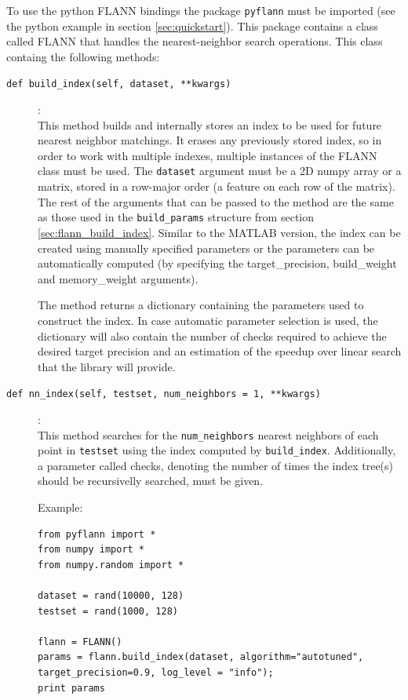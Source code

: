 \documentclass[letter,10pt]{article}
\begin{document}
To use the python FLANN bindings the package \texttt{pyflann} must be imported
(see the python example in section \ref{sec:quickstart}). This package contains
a class called FLANN that handles the nearest-neighbor search operations. This
class containg the following methods:
\begin{description}
\item [\texttt{def build\_index(self, dataset, **kwargs)}] :\\
    This method builds and internally stores an index to be used for future
nearest neighbor matchings. It erases any previously stored index, so in order
to work with multiple indexes, multiple instances of the FLANN class must be
used. The \texttt{dataset} argument must be a 2D numpy array or a matrix, stored in a
row-major order (a feature on each row of the matrix). The
rest of the arguments that can be passed to the method are the same as
 those used in the \texttt{build\_params} structure from
section \ref{sec:flann_build_index}. Similar to the MATLAB version, the index
can be created using manually specified parameters or the parameters can be
automatically computed (by specifying the target\_precision, build\_weight and
memory\_weight arguments).

The method returns a dictionary containing the parameters used to construct the
index. In case automatic parameter selection is used, the dictionary will also
contain the number of checks required to achieve the desired target precision
and an estimation of the speedup over linear search that the library will
provide.


\item [\texttt{def nn\_index(self, testset, num\_neighbors = 1, **kwargs)}] :\\
    This method searches for the \texttt{num\_neighbors} nearest neighbors of
each point in \texttt{testset} using the index computed by
\texttt{build\_index}. Additionally, a parameter called checks, denoting the
number of times the index tree(s) should be recursivelly searched, must be
given.

Example:
\begin{Verbatim}[fontsize=\scriptsize,frame=single]
from pyflann import *
from numpy import *
from numpy.random import *

dataset = rand(10000, 128)
testset = rand(1000, 128)

flann = FLANN()
params = flann.build_index(dataset, algorithm="autotuned", target_precision=0.9, log_level = "info");
print params


\end{Verbatim}
\end{description}
\end{document}
